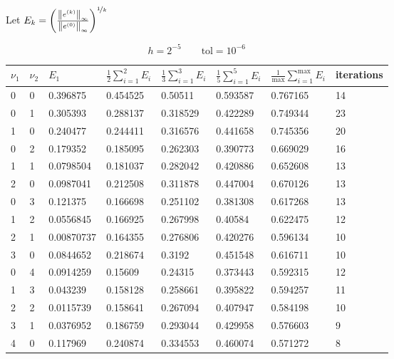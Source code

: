 \documentclass{article} %
\theoremstyle{plain}
\numberwithin{equation}{section} %
\numberwithin{figure}{section} %
\numberwithin{table}{section} %
\begin{document}
Let $E_k = \qty(\frac{\norm{e^{(k)}}_\infty}{\norm{e^{(0)}}_\infty})^{\nicefrac{1}{k}}$
\begin{table}
\caption*{$h = 2^{-5} \qquad \text{tol}=10^{-6}$}
\begin{center}
\begin{tabular}{||ll||lllll||l||}
\hline\hline
   $\nu_1$ &   $\nu_2$ & $E_1$ & $\displaystyle\frac{1}{2}\sum_{i=1}^2E_i$ & $\displaystyle\frac{1}{3}\sum_{i=1}^3E_i$ & $\displaystyle\frac{1}{5}\sum_{i=1}^5E_i$ & $\displaystyle\frac{1}{\max}\sum_{i=1}^{\max}E_i$ & iterations \\
\hline\hline
      0 &      0 & 0.396875   & 0.454525 & 0.50511  & 0.593587 & 0.767165 &    14 \\\hline
      0 &      1 & 0.305393   & 0.288137 & 0.318529 & 0.422289 & 0.749344 &    23 \\
      1 &      0 & 0.240477   & 0.244411 & 0.316576 & 0.441658 & 0.745356 &    20 \\\hline
      0 &      2 & 0.179352   & 0.185095 & 0.262303 & 0.390773 & 0.669029 &    16 \\
      1 &      1 & 0.0798504  & 0.181037 & 0.282042 & 0.420886 & 0.652608 &    13 \\
      2 &      0 & 0.0987041  & 0.212508 & 0.311878 & 0.447004 & 0.670126 &    13 \\\hline
      0 &      3 & 0.121375   & 0.166698 & 0.251102 & 0.381308 & 0.617268 &    13 \\
      1 &      2 & 0.0556845  & 0.166925 & 0.267998 & 0.40584  & 0.622475 &    12 \\
      2 &      1 & 0.00870737 & 0.164355 & 0.276806 & 0.420276 & 0.596134 &    10 \\
      3 &      0 & 0.0844652  & 0.218674 & 0.3192   & 0.451548 & 0.616711 &    10 \\\hline
      0 &      4 & 0.0914259  & 0.15609  & 0.24315  & 0.373443 & 0.592315 &    12 \\
      1 &      3 & 0.043239   & 0.158128 & 0.258661 & 0.395822 & 0.594257 &    11 \\
      2 &      2 & 0.0115739  & 0.158641 & 0.267094 & 0.407947 & 0.584198 &    10 \\
      3 &      1 & 0.0376952  & 0.186759 & 0.293044 & 0.429958 & 0.576603 &     9 \\
      4 &      0 & 0.117969   & 0.240874 & 0.334553 & 0.460074 & 0.571272 &     8 \\
\hline\hline
\end{tabular}
\end{center}
\end{table}
\end{document}
